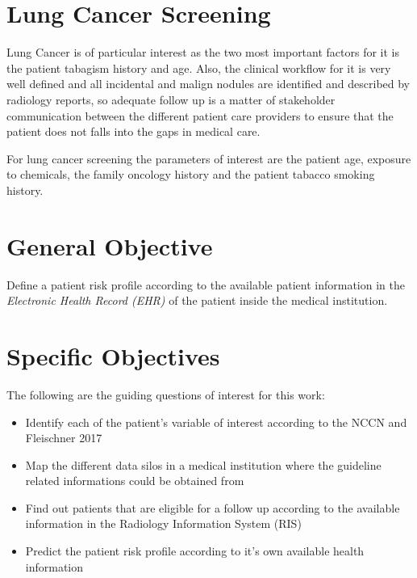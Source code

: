 \section{Lung Cancer Screening}

Lung Cancer is of particular interest as the two most important factors for it is the patient tabagism history and age\cite{fleischner2017}. Also, the clinical workflow for it is very well defined and all incidental and malign nodules are identified and described by radiology reports, so adequate follow up is a matter of stakeholder communication between the different patient care providers to ensure that the patient does not falls into the gaps in medical care. 

For lung cancer screening the parameters of interest are the patient age, exposure to chemicals, the family oncology history and the patient tabacco smoking history\cite{fleischner2017}\cite{parasuraman2000}\cite{jaklitsch2012}.

\section{General Objective}

Define a patient risk profile according to the available patient information in the \emph{Electronic Health Record (EHR)} of the patient inside the medical institution. %

\section{Specific Objectives}

The following are the guiding questions of interest for this work:

\begin{itemize}
  \item Identify each of the patient's variable of interest according to the NCCN and Fleischner 2017
  \item Map the different data silos in a medical institution where the guideline related informations could be obtained from
  \item Find out patients that are eligible for a follow up according to the available information in the Radiology Information System (RIS)
  \item Predict the patient risk profile according to it's own available health information
\end{itemize}
